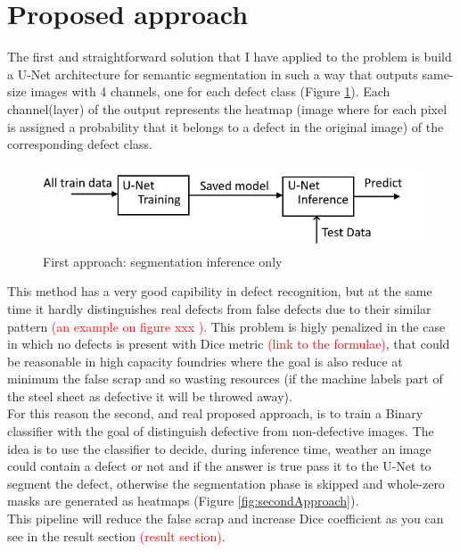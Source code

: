 \documentclass[10pt,twocolumn,letterpaper]{article}
\begin{document}
\section{Proposed approach}
   The first and straightforward solution that I have applied to the problem is build a U-Net architecture for semantic segmentation in such a way that outputs same-size images with 4 channels, one for each defect class (Figure \ref{fig:firstApproach}). 
   Each channel(layer) of the output represents the heatmap (image where for each pixel is assigned a probability that it belongs to a defect in the original image) of the corresponding defect class. 

   \begin{figure}[h]
      \centering
      \caption{First approach: segmentation inference only} \label{fig:firstApproach}
      \includegraphics[scale=0.55]{Img_FirstApproach}
   \end{figure}

   This method has a very good capibility in defect recognition, but at the same time it hardly distinguishes real defects from false defects due to their similar pattern \textcolor{red}{(an example on figure xxx )}. This problem is higly penalized in the case in which no defects is present with Dice metric \textcolor{red}{(link to the formulae)}, that could be reasonable in high capacity foundries where the goal is also reduce at minimum the false scrap and so wasting resources (if the machine labels part of the steel sheet as defective it will be throwed away).\\
   For this reason the second, and real proposed approach, is to train a Binary classifier with the goal of distinguish defective from non-defective images. The idea is to use the classifier to decide, during inference time, weather an image could contain a defect or not and if the answer is true pass it to the U-Net to segment the defect, otherwise the segmentation phase is skipped and whole-zero masks are generated as heatmaps (Figure \ref{fig:secondApproach}).\\
   This pipeline will reduce the false scrap and increase Dice coefficient as you can see in the result section \textcolor{red}{(result section)}.
    
\end{document}
